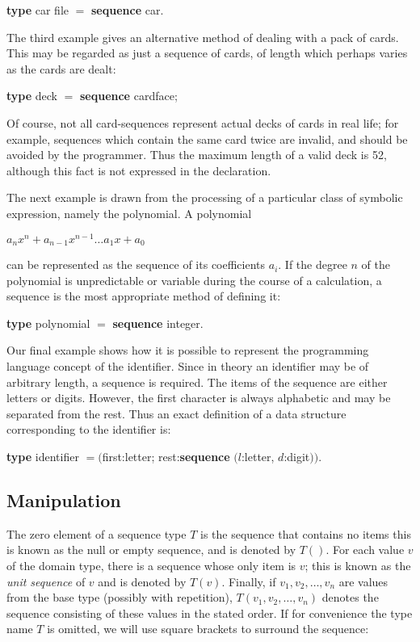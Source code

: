 \quad \textbf{type} car file $=$ \textbf{sequence} car.

The third example gives an alternative method of dealing with a pack of cards. This may be regarded as just a sequence of cards, of length which perhaps varies as the cards are dealt:

\quad \textbf{type} deck $=$ \textbf{sequence} cardface;

\noindent
Of course, not all card-sequences represent actual decks of cards in real life; for example, sequences which contain the same card twice are invalid, and should be avoided by the programmer. Thus the maximum length of a valid deck is 52, although this fact is not expressed in the declaration.

The next example is drawn from the processing of a particular class of symbolic expression, namely the polynomial. A polynomial

$a_n x^n + a_{n-1}x^{n-1}\dots a_1 x + a_0$

\noindent
can be represented as the sequence of its coefficients $a_i$. If the degree $n$ of the polynomial is unpredictable or variable during the course of a calculation, a sequence is the most appropriate method of defining it:

\quad \textbf{type} polynomial $=$ \textbf{sequence} integer.

Our final example shows how it is possible to represent the programming language concept of the identifier. Since in theory an identifier may be of arbitrary length, a sequence is required. The items of the sequence are either letters or digits. However, the first character is always alphabetic and may be separated from the rest. Thus an exact definition of a data structure corresponding to the identifier is:

\quad \textbf{type} identifier $= ($first:letter; rest:\textbf{sequence} $(l$:letter, $d$:digit$))$.

\subsection{Manipulation}

The zero element of a sequence type $T$ is the sequence that contains no items \textemdash{} this is known as the null or empty sequence, and is denoted by $T()$. For each value $v$ of the domain type, there is a sequence whose only item is $v$; this is known as the \textit{unit sequence} of $v$ and is denoted by $T(v)$. Finally, if $v_1, v_2, \dots, v_n$ are values from the base type (possibly with repetition),
$T(v_1, v_2, \dots, v_n)$ denotes the sequence consisting of these values in the stated order. If for convenience the type name $T$ is omitted, we will use square brackets to surround the sequence:

